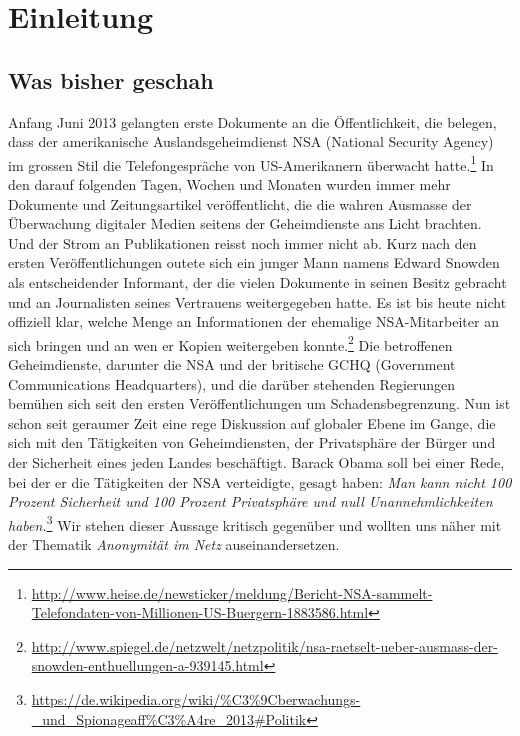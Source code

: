 \newpage
\section{Einleitung}

\subsection{Was bisher geschah}
Anfang Juni 2013 gelangten erste Dokumente an die Öffentlichkeit, die belegen, dass der amerikanische Auslandsgeheimdienst NSA (National Security Agency) im grossen Stil die Telefongespräche von US-Amerikanern überwacht hatte.\footnote{\url{http://www.heise.de/newsticker/meldung/Bericht-NSA-sammelt-Telefondaten-von-Millionen-US-Buergern-1883586.html}}
In den darauf folgenden Tagen, Wochen und Monaten wurden immer mehr Dokumente und Zeitungsartikel veröffentlicht, die die wahren Ausmasse der Überwachung digitaler Medien seitens der Geheimdienste ans Licht brachten. Und der Strom an Publikationen reisst noch immer nicht ab. Kurz nach den ersten Veröffentlichungen outete sich ein junger Mann namens Edward Snowden als entscheidender Informant, der die vielen Dokumente in seinen Besitz gebracht und an Journalisten seines Vertrauens weitergegeben hatte. Es ist bis heute nicht offiziell klar, welche Menge an Informationen der ehemalige NSA-Mitarbeiter an sich bringen und an wen er Kopien weitergeben konnte.\footnote{\url{http://www.spiegel.de/netzwelt/netzpolitik/nsa-raetselt-ueber-ausmass-der-snowden-enthuellungen-a-939145.html}}
Die betroffenen Geheimdienste, darunter die NSA und der britische GCHQ (Government Communications Headquarters), und die darüber stehenden Regierungen bemühen sich seit den ersten Veröffentlichungen um Schadensbegrenzung. Nun ist schon seit geraumer Zeit eine rege Diskussion auf globaler Ebene im Gange, die sich mit den Tätigkeiten von Geheimdiensten, der Privatsphäre der Bürger und der Sicherheit eines jeden Landes beschäftigt. Barack Obama soll bei einer Rede, bei der er die Tätigkeiten der NSA verteidigte, gesagt haben: \textit{Man kann nicht 100 Prozent Sicherheit und 100 Prozent Privatsphäre und null Unannehmlichkeiten haben.}\footnote{\url{https://de.wikipedia.org/wiki/\%C3\%9Cberwachungs-_und_Spionageaff\%C3\%A4re_2013\#Politik}}
Wir stehen dieser Aussage kritisch gegenüber und wollten uns näher mit der Thematik \textit{Anonymität im Netz} auseinandersetzen.

